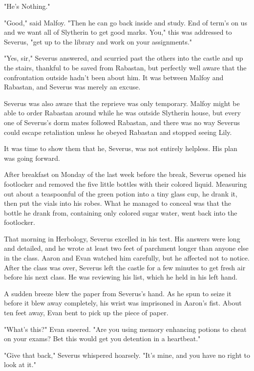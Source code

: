 "He's{\el} Nothing."

"Good," said Malfoy. "Then he can go back inside and study. End of term's on us and we want all of Slytherin to get good marks. You," this was addressed to Severus, "get up to the library and work on your assignments."

"Yes, sir," Severus answered, and scurried past the others into the castle and up the stairs, thankful to be saved from Rabastan, but perfectly well aware that the confrontation outside hadn't been about him. It was between Malfoy and Rabastan, and Severus was merely an excuse.

Severus was also aware that the reprieve was only temporary. Malfoy might be able to order Rabastan around while he was outside Slytherin house, but every one of Severus's dorm mates followed Rabastan, and there was no way Severus could escape retaliation unless he obeyed Rabastan and stopped seeing Lily.

It was time to show them that he, Severus, was not entirely helpless. His plan was going forward.

After breakfast on Monday of the last week before the break, Severus opened his footlocker and removed the five little bottles with their colored liquid. Measuring out about a teaspoonful of the green potion into a tiny glass cup, he drank it, then put the vials into his robes. What he managed to conceal was that the bottle he drank from, containing only colored sugar water, went back into the footlocker.

That morning in Herbology, Severus excelled in his test. His answers were long and detailed, and he wrote at least two feet of parchment longer than anyone else in the class. Aaron and Evan watched him carefully, but he affected not to notice. After the class was over, Severus left the castle for a few minutes to get fresh air before his next class. He was reviewing his list, which he held in his left hand.

A sudden breeze blew the paper from Severus's hand. As he spun to seize it before it blew away completely, his wrist was imprisoned in Aaron's fist. About ten feet away, Evan bent to pick up the piece of paper.

"What's this?" Evan sneered. "Are you using memory enhancing potions to cheat on your exams? Bet this would get you detention in a heartbeat."

"Give that{\el} back," Severus whispered hoarsely. "It's{\el} mine, and you have no{\el} right to{\el} look at it."

